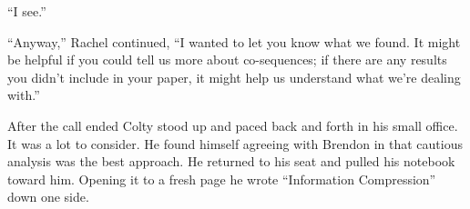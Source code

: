 ``I see.''

``Anyway,'' Rachel continued, ``I wanted to let you know what we found. It might be helpful if
you could tell us more about co-sequences; if there are any results you didn't include in your
paper, it might help us understand what we're dealing with.''

After the call ended Colty stood up and paced back and forth in his small office. It was a lot
to consider. He found himself agreeing with Brendon in that cautious analysis was the best
approach. He returned to his seat and pulled his notebook toward him. Opening it to a fresh page
he wrote ``Information Compression'' down one side.

